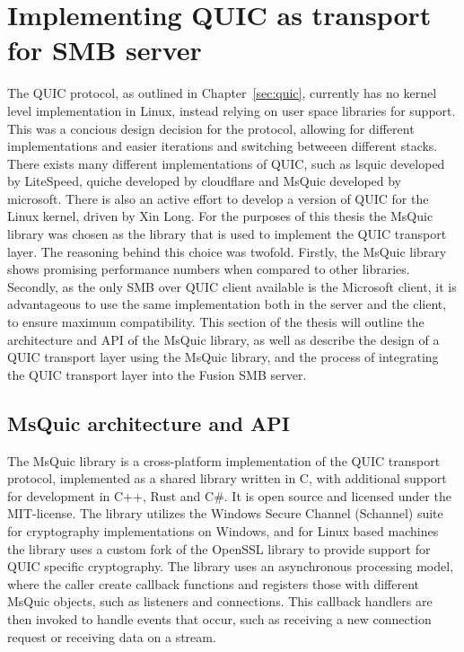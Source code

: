\documentclass[english, 12pt, a4paper, elec, utf8, a-2b, online]{aaltothesis}
\begin{document}
\section{Implementing QUIC as transport for SMB server}
\label{sec:implementation}
The QUIC protocol, as outlined in Chapter~\ref{sec:quic}, currently has no kernel
level implementation in Linux, instead relying on user space libraries for support.
This was a concious design decision for the protocol, allowing for different
implementations and easier iterations and switching betweeen different stacks.
There exists many different implementations of QUIC, such as lsquic developed by
LiteSpeed, quiche developed by cloudflare and MsQuic developed by microsoft\cite{quic_implementations}.
There is also an active effort to develop a version of QUIC for the Linux kernel,
driven by Xin Long\cite{quic_linux_kernel}. For the purposes of this thesis the
MsQuic library was chosen as the library that is used to implement the QUIC transport
layer. The reasoning behind this choice was twofold. Firstly, the MsQuic library
shows promising performance numbers when compared to other libraries\cite{quic_perf}.
Secondly, as the only SMB over QUIC client available is the Microsoft client, it is
advantageous to use the same implementation both in the server and the client,
to ensure maximum compatibility. This section of the thesis will outline the
architecture and API of the MsQuic library, as well as describe the design of
a QUIC transport layer using the MsQuic library, and the process of integrating
the QUIC transport layer into the Fusion SMB server.

\subsection{MsQuic architecture and API}

The MsQuic library is a cross-platform implementation of the QUIC transport protocol,
implemented as a shared library written in C, with additional support for development
in C++, Rust and C\#. It is open source and licensed under the MIT-license. The library
utilizes the Windows Secure Channel (Schannel) suite for cryptography implementations
on Windows, and for Linux based machines the library uses a custom fork of the
OpenSSL library to provide support for QUIC specific cryptography\cite{msquic}. The
library uses an asynchronous processing model, where the caller create callback functions
and registers those with different MsQuic objects, such as listeners and connections.
This callback handlers are then invoked to handle events that occur, such as receiving
a new connection request or receiving data on a stream\cite{msquic_docs}. 
\end{document}
